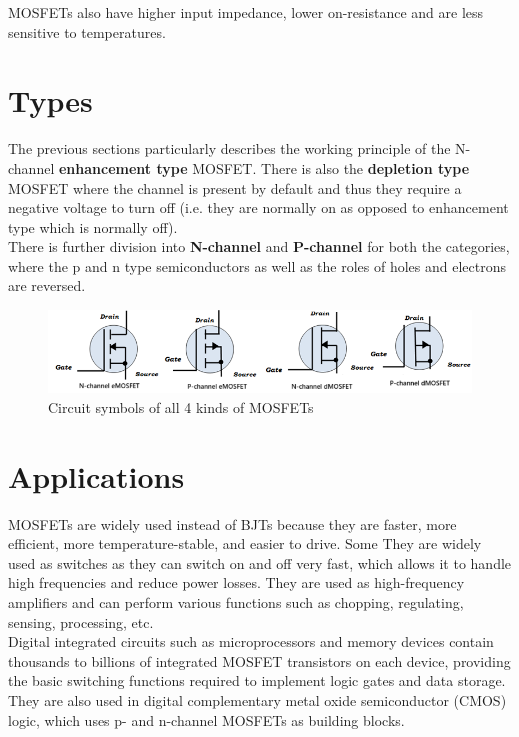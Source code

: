 MOSFETs also have higher input impedance, lower on-resistance and are less sensitive to temperatures.

\section*{Types}
The previous sections particularly describes the working principle of the N-channel \textbf{enhancement type} MOSFET. There is also the \textbf{depletion type} MOSFET where the channel is present by default and thus they require a negative voltage to turn off (i.e. they are normally on as opposed to enhancement type which is normally off).\\

There is further division into \textbf{N-channel} and \textbf{P-channel} for both the categories, where the p and n type semiconductors as well as the roles of holes and electrons are reversed.

\begin{figure}[H]
    \centering
    \includegraphics[width=1\columnwidth]{images/types1.png}
    \caption{Circuit symbols of all 4 kinds of MOSFETs}
\end{figure}

\section*{Applications}
MOSFETs are widely used instead of BJTs because they are faster, more efficient, more temperature-stable, and easier to drive. Some They are widely used as switches as they can switch on and off very fast, which allows it to handle high frequencies and reduce power losses. They are used as high-frequency amplifiers and can perform various functions such as chopping, regulating, sensing, processing, etc.\\

Digital integrated circuits such as microprocessors and memory devices contain thousands to billions of integrated MOSFET transistors on each device, providing the basic switching functions required to implement logic gates and data storage. They are also used in digital complementary metal oxide semiconductor (CMOS) logic, which uses p- and n-channel MOSFETs as building blocks.